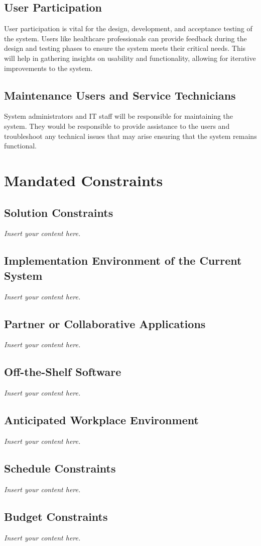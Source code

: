 \documentclass[12pt]{article}
\newcommand{\lips}{\textit{Insert your content here.}}
\begin{document}
\subsection{User Participation}
User participation is vital for the design, development, and acceptance testing of the system. Users like healthcare professionals can provide feedback during the design and testing phases to ensure the system meets their critical needs. This will help in gathering insights on usability and functionality, allowing for iterative improvements to the system.

\subsection{Maintenance Users and Service Technicians}
System administrators and IT staff will be responsible for maintaining the system. They would be responsible to provide assistance to the users and troubleshoot any technical issues that may arise ensuring that the system remains functional. 

\section{Mandated Constraints}
\subsection{Solution Constraints}
\lips
\subsection{Implementation Environment of the Current System}
\lips
\subsection{Partner or Collaborative Applications}
\lips
\subsection{Off-the-Shelf Software}
\lips
\subsection{Anticipated Workplace Environment}
\lips
\subsection{Schedule Constraints}
\lips
\subsection{Budget Constraints}
\lips
\end{document}
